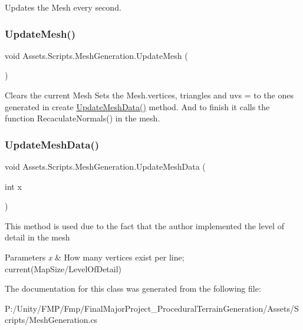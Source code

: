 Updates the Mesh every second. 

\mbox{\label{class_assets_1_1_scripts_1_1_mesh_generation_a41a4e7a75db511109f7837f1f0fa376b}} 
\subsubsection{\texorpdfstring{UpdateMesh()}{UpdateMesh()}}
{\footnotesize\ttfamily void Assets.\+Scripts.\+Mesh\+Generation.\+Update\+Mesh (\begin{DoxyParamCaption}{ }\end{DoxyParamCaption})}



Clears the current Mesh Sets the Mesh.\+vertices, triangles and uvs = to the ones generated in create \mbox{\hyperlink{class_assets_1_1_scripts_1_1_mesh_generation_abaeb22e0f390a218be5d9543138f52b9}{Update\+Mesh\+Data()}} method. And to finish it calls the function Recaculate\+Normals() in the mesh. 

\mbox{\label{class_assets_1_1_scripts_1_1_mesh_generation_abaeb22e0f390a218be5d9543138f52b9}} 
\subsubsection{\texorpdfstring{UpdateMeshData()}{UpdateMeshData()}}
{\footnotesize\ttfamily void Assets.\+Scripts.\+Mesh\+Generation.\+Update\+Mesh\+Data (\begin{DoxyParamCaption}\item[{int}]{x }\end{DoxyParamCaption})}



This method is used due to the fact that the author implemented the level of detail in the mesh 


\begin{DoxyParams}{Parameters}
{\em x} & How many vertices exist per line; current(Map\+Size/\+Level\+Of\+Detail)\\
\hline
\end{DoxyParams}


The documentation for this class was generated from the following file\+:\begin{DoxyCompactItemize}
\item 
P\+:/\+Unity/\+F\+M\+P/\+Fmp/\+Final\+Major\+Project\+\_\+\+Procedural\+Terrain\+Generation/\+Assets/\+Scripts/Mesh\+Generation.\+cs\end{DoxyCompactItemize}
